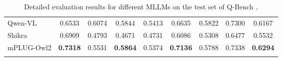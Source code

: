 \documentclass[10pt,twocolumn,letterpaper]{article}
\newlength\savewidth
\newcommand\shline{\noalign{\global\savewidth\arrayrulewidth\global\arrayrulewidth 1pt}\hline\noalign{\global\arrayrulewidth\savewidth}}
\newcommand{\modelname}{mPLUG-Owl2\xspace}
\begin{document}
\begin{table*}[h]
{\begin{tabular}{l|cccccccc}
Qwen-VL \cite{Bai2023QwenVL}         & 0.6533             & 0.6074        & 0.5844       & 0.5413              & 0.6635          & 0.5822                         & 0.7300                     & 0.6167           \\
Shikra  \cite{Chen2023Shikra}          & 0.6909             & 0.4793        & 0.4671       & 0.4731              & 0.6086          & 0.5308                         & 0.6477                     & 0.5532          \\
\hline
\modelname           & \textbf{0.7318}             & 0.5531        & \textbf{0.5864}       & 0.5374              & \textbf{0.7136}          & 0.5788                         & 0.7338                     & \textbf{0.6294}          \\
\shline
\end{tabular}
}
\caption{Detailed evaluation results for different MLLMs on the test set of Q-Bench \cite{wu2023qbench}.}
\label{tab:qbench-eval}
\end{table*}
\end{document}
